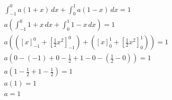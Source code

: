 \documentclass[11pt]{article}
\begin{document}
    \begin{1.6}
        \begin{gather*}
            \int_{-1}^{0} a(1+x) \, dx + \int_{0}^{1} a(1-x) \, dx = 1\\
            a \left( \int_{-1}^{0} 1+x \, dx + \int_{0}^{1} 1-x \, dx \right) = 1\\
            a\left( \left( [x]_{-1}^{0} + \left[ \frac{1}{2} x^{2} \right]_{-1}^{0} \right) + \left(  [x]_{0}^{1} + \left[ \frac{1}{2} x^{2} \right]_{0}^{1}  \right) \right) = 1 \\
            a(0 - (-1) + 0- \frac{1}{2} + 1 - 0 - (\frac{1}{2} - 0)) = 1 \\
            a(1 - \frac{1}{2} + 1 - \frac{1}{2}) = 1 \\
            a(1) = 1 \\
            a = 1 \\
        \end{gather*}
    \end{1.6}
\end{document}
